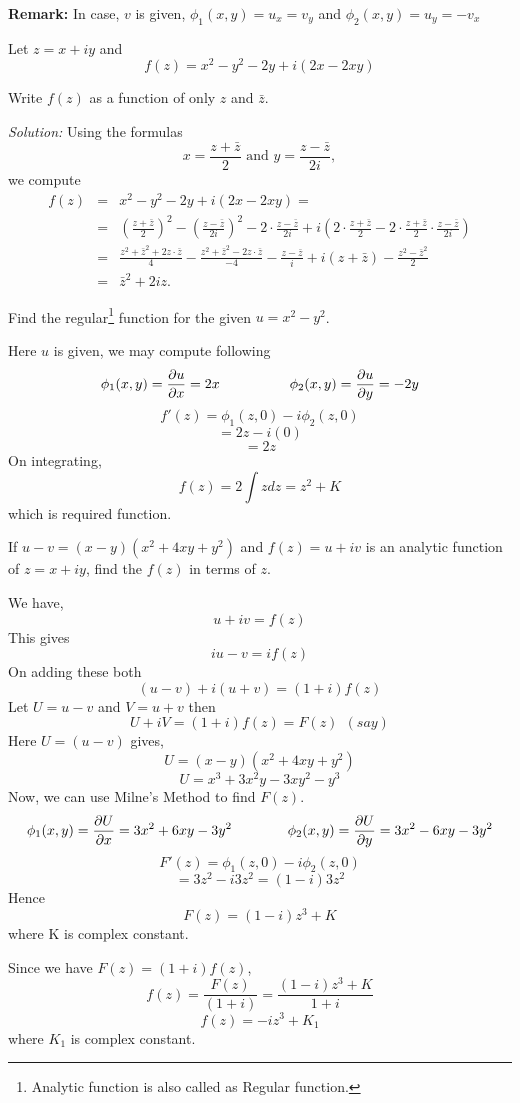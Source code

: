 \textbf{Remark: } In case, $v$ is given,  $\phi_1(x,y) =u_x = v_y $ and $\phi_2(x,y) = u_y = -v_x$
\begin{example}
Let $z=x+iy$ and 
  \[
    f(z) = x^2-y^2 - 2y +i(2x-2xy)
  \]
  
Write $f(z)$ as a function of only $z$ and $\bar{z}$.
\end{example}
{\it Solution:} Using the formulas $$x=\frac{z+\bar z}{2} \text { and } y=\frac{z-\bar z}{2i},$$
we compute
\begin{eqnarray*} 
f(z)& =& x^2-y^2 - 2y +i(2x-2xy)=\\
&=& \left(\frac{z+\bar z}{2}\right)^2-\left(\frac{z-\bar z}{2i}\right)^2 -2\cdot\frac{z-\bar z}{2i} + i\left(2\cdot \frac{z+\bar z}{2}-2\cdot \frac{z+\bar z}{2}\cdot\frac{z-\bar z}{2i}\right) \\
&=&\frac{z^2+\bar z^2+2z\cdot \bar z}{4}-\frac{z^2+\bar z^2-2z\cdot \bar z}{-4}-\frac{z-\bar z}{i}+i(z+\bar z)-\frac{z^2-\bar z^2}{2}\\        &=&{\bar{z}}^2+2iz.
\end{eqnarray*}
\begin{example}
Find the regular\footnote{Analytic function is also called as Regular function.} function for the given $u = x^2 - y^2$.
\end{example}
\begin{solution}
Here $u$ is given, we may compute following
\[ \phi_1(x,y) = \displaystyle \frac{\partial u}{\partial x} = 2x ~~~~~~~~~~~~~~~ \phi_2(x,y) =\displaystyle \frac{\partial u}{\partial y} = -2y\]
\[f'(z)= \phi_1(z,0)- i \phi_2(z,0)\]
\[= 2z - i(0)\]
\[= 2z\]
On integrating,
\[f(z) = 2 \int z dz = z^2 + K\]
which is required function.
\end{solution}
\begin{example}
If $u-v = (x-y)(x^2+4xy+y^2)$ and $f(z)=u+iv$ is an analytic function of $z=x+iy$, find the $f(z)$ in terms of $z$.
\end{example}
\begin{solution}
We have, \[u+iv = f(z)\]
This gives \[iu-v = if(z)\]
On adding these both
\[(u-v) + i(u+v) = (1+i)f(z)\]
Let $U=u-v$ and $V=u+v$ then 
\[U+iV = (1+i)f(z) = F(z) ~~(say)\]
Here $U=(u-v)$ gives,
\[U =(x-y)(x^2+4xy+y^2) \]
\[U =x^3 + 3x^2y - 3xy^2 -y^3 \]
Now, we can use Milne's Method to find $F(z)$.
\[ \phi_1(x,y) = \displaystyle \frac{\partial U}{\partial x} = 3x^2+6xy-3y^2 ~~~~~~~~~~~~ \phi_2(x,y) =\displaystyle \frac{\partial U}{\partial y} =3x^2-6xy-3y^2 \]
\[F'(z)= \phi_1(z,0)- i \phi_2(z,0)\]
\[=3z^2 - i 3z^2 = (1-i)3z^2\]
Hence
\[F(z) = (1-i)z^3 + K \]
where K is complex constant.

\noindent
Since we have $F(z) = (1+i)f(z)$,
\[f(z) = \frac{F(z)}{(1+i)} = \frac{(1-i)z^3 + K }{1+i}\]
\[f(z) = -iz^3 + K_1\]
where $K_1$ is complex constant.
\end{solution}
